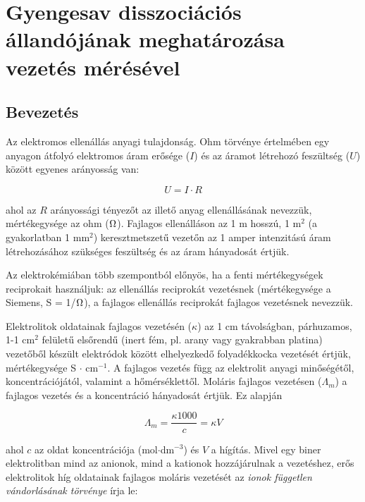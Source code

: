 \section{Gyengesav disszociációs állandójának meghatározása vezetés mérésével}
\subsection{Bevezetés}
Az elektromos ellenállás anyagi tulajdonság.
Ohm törvénye értelmében egy anyagon átfolyó elektromos áram erősége ($I$) és az áramot létrehozó feszültség ($U$) között egyenes arányosság van:

\begin{equation}
\label{eq:ohm}
	U
	=
	I
	\cdot
	R
\end{equation}

ahol az $R$ arányossági tényezőt az illető anyag ellenállásának nevezzük, mértékegysége az ohm ($\ohm$).
Fajlagos ellenálláson az 1 m hosszú, 1 m$^2$ (a gyakorlatban 1 mm$^2$) keresztmetszetű vezetőn az 1 amper intenzitású áram létrehozásához szükséges feszültség és az áram hányadosát értjük.

Az elektrokémiában több szempontból előnyös, ha a fenti mértékegységek reciprokait használjuk: az ellenállás reciprokát vezetésnek (mértékegysége a Siemens, S = 1/$\ohm$), a fajlagos ellenállás reciprokát fajlagos vezetésnek nevezzük.

Elektrolitok oldatainak fajlagos vezetésén ($\kappa$) az 1 cm távolságban, párhuzamos, 1-1 cm$^2$ felületű elsőrendű (inert fém, pl. arany vagy gyakrabban platina) vezetőből készült elektródok között elhelyezkedő folyadékkocka vezetését értjük, mértékegysége S $\cdot$ cm$^{-1}$.
A fajlagos vezetés függ az elektrolit anyagi minőségétől, koncentrációjától, valamint a hőmérséklettől.
Moláris fajlagos vezetésen ($\Lambda _m$) a fajlagos vezetés és a koncentráció hányadosát értjük. Ez alapján

\begin{equation}
\label{eq:lambdam}
        \Lambda_m
        =
        \frac
		{\kappa 1000 }
		{c}
	=
	\kappa V
\end{equation}

ahol $c$ az oldat koncentrációja (mol$\cdot$dm$^{-3}$) és $V$ a hígítás.
Mivel egy biner elektrolitban mind az anionok, mind a kationok hozzájárulnak a vezetéshez, erős elektrolitok híg oldatainak fajlagos moláris vezetését az \emph{ionok független vándorlásának törvénye} írja le:

